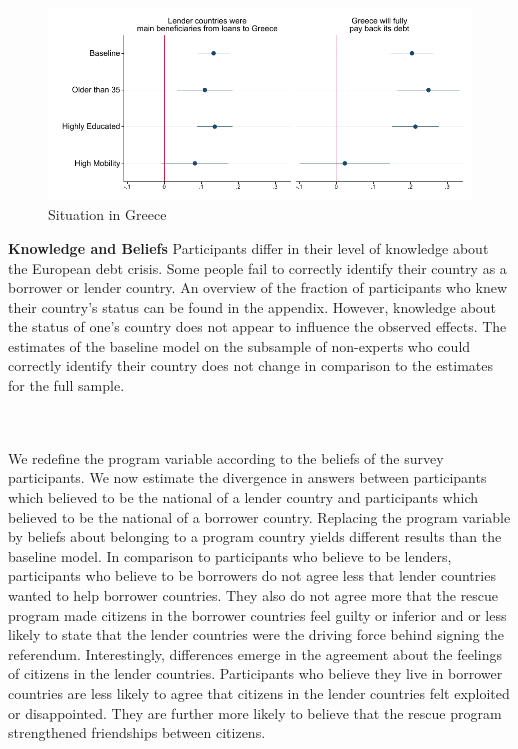 \begin{figure}[h!]
    \begin{center}
     \caption{Situation in Greece}
    \includegraphics[scale=1.2]{socio_question6_7.pdf}
    \end{center}
    \tiny
\end{figure}
\clearpage


\textbf{Knowledge and Beliefs}
Participants differ in their level of knowledge about the European debt crisis. Some people fail to correctly identify their country as a borrower or lender country. An overview of the fraction of participants who knew their country's status can be found in the appendix. However, knowledge about the status of one's country does not appear to influence the observed effects. The estimates of the baseline model on the subsample of non-experts who could correctly identify their country does not change in comparison to the estimates for the full sample. 

\\\\
We redefine the program variable according to the beliefs of the survey participants. We now estimate the divergence in answers between participants which believed to be the national of a  lender country and participants which believed to be the national of a borrower country. Replacing the program variable by beliefs about belonging to a program country yields different results than the baseline model. In comparison to participants who believe to be lenders, participants who believe to be borrowers do not agree less that lender countries wanted to help borrower countries. They also do not agree more that the rescue program made citizens in the borrower countries feel guilty or inferior and or less likely to state that the lender countries were the driving force behind signing the referendum. Interestingly, differences emerge in the agreement about the feelings of citizens in the lender countries. Participants who believe they live in borrower countries are less likely to agree that citizens in the lender countries felt exploited or disappointed. They are further more likely to believe that the rescue program strengthened friendships between citizens. \\

